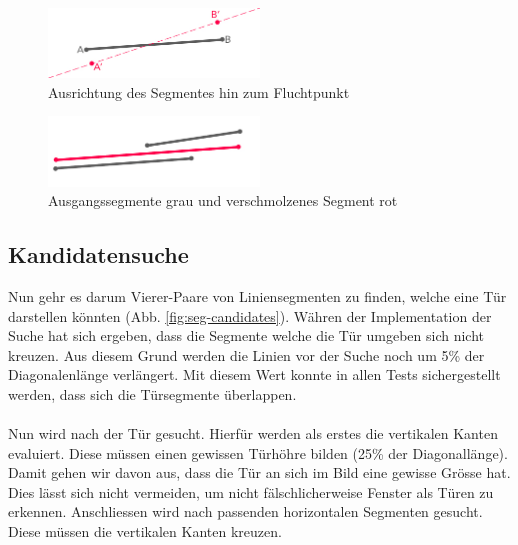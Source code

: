 \begin{figure}[!ht]
\centering
\includegraphics[width=0.5\textwidth]{images/segment-joining-3} 
\caption{Ausrichtung des Segmentes hin zum Fluchtpunkt}
\label{fig:segment-joining-3}
\end{figure}

\begin{figure}[!ht]
\centering
\includegraphics[width=0.5\textwidth]{images/segment-joining-2} 
\caption{Ausgangssegmente grau und verschmolzenes Segment rot}
\label{fig:segment-joining-2}
\end{figure}

\subsection{Kandidatensuche}
Nun gehr es darum Vierer-Paare von Liniensegmenten zu finden, welche eine Tür darstellen könnten (Abb. \ref{fig:seg-candidates}). Währen der Implementation der Suche hat sich ergeben, dass die Segmente welche die Tür umgeben sich nicht kreuzen. Aus diesem Grund werden die Linien vor der Suche noch um 5\% der Diagonalenlänge verlängert. Mit diesem Wert konnte in allen Tests sichergestellt werden, dass sich die Türsegmente überlappen. 
\paragraph{}
Nun wird nach der Tür gesucht. Hierfür werden als erstes die vertikalen Kanten evaluiert. Diese müssen einen gewissen Türhöhre bilden (25\% der Diagonallänge). Damit gehen wir davon aus, dass die Tür an sich im Bild eine gewisse Grösse hat. Dies lässt sich nicht vermeiden, um nicht fälschlicherweise Fenster als Türen zu erkennen. Anschliessen wird nach passenden horizontalen Segmenten gesucht. Diese müssen die vertikalen Kanten kreuzen.

